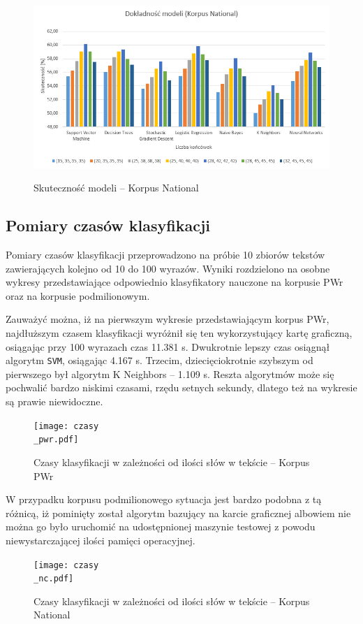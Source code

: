 \begin{figure}[!htbp]
	\centering
	\includegraphics[scale=0.8]{korpusnationalwykres}
	\label{Rysunek}
	\caption{Skuteczność modeli -- Korpus National}
\end{figure}

\newpage

\subsection{Pomiary czasów klasyfikacji}

Pomiary czasów klasyfikacji przeprowadzono na próbie 10 zbiorów tekstów zawierających kolejno od 10 do 100 wyrazów. Wyniki rozdzielono na osobne wykresy przedstawiające odpowiednio klasyfikatory nauczone na korpusie PWr oraz na korpusie podmilionowym.

Zauważyć można, iż na pierwszym wykresie przedstawiającym korpus PWr, najdłuższym czasem klasyfikacji wyróżnił się ten wykorzystujący kartę graficzną, osiągając przy 100 wyrazach czas 11.381 s. Dwukrotnie lepszy czas osiągnął algorytm \texttt{SVM}, osiągając 4.167 s. Trzecim, dziecięciokrotnie szybszym od pierwszego był algorytm K Neighbors -- 1.109 s. Reszta algorytmów może się pochwalić bardzo niskimi czasami, rzędu setnych sekundy, dlatego też na wykresie są prawie niewidoczne.

\begin{figure}[!htbp]
	\centering
	\texttt{[image: czasy\\\_pwr.pdf]}
	\label{Rysunek}
	\caption{Czasy klasyfikacji w zależności od ilości słów w tekście -- Korpus PWr}
\end{figure}

W przypadku korpusu podmilionowego sytuacja jest bardzo podobna z tą różnicą, iż pominięty został algorytm bazujący na karcie graficznej albowiem nie można go było uruchomić na udostępnionej maszynie testowej z powodu niewystarczającej ilości pamięci operacyjnej.

\begin{figure}[!htbp]
	\centering
	\texttt{[image: czasy\\\_nc.pdf]}
	\label{Rysunek}
	\caption{Czasy klasyfikacji w zależności od ilości słów w tekście -- Korpus National}
\end{figure}
